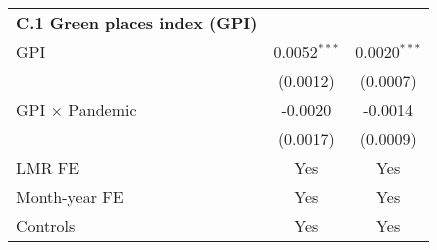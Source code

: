 {\begin{tabular}{lcc}
      \textbf{C.1 Green places index (GPI)}\\
      \hspace{0.5cm} GPI                                       & 0.0052$^{***}$ & 0.0020$^{***}$           \\
      \hspace{0.5cm}                                           & (0.0012)       & (0.0007)                 \\
      \hspace{0.5cm} GPI $\times$ Pandemic                     & -0.0020        & -0.0014                  \\
      \hspace{0.5cm}                                           & (0.0017)       & (0.0009)                 \\
      \hline
      LMR FE                                    & Yes             & Yes                     \\
      Month-year FE                             & Yes             & Yes                     \\
      Controls                                  & Yes             & Yes                     \\
    \hline\hline
\end{tabular}
}
